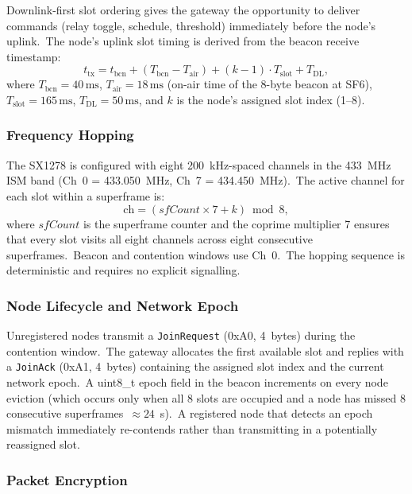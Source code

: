\documentclass[conference]{IEEEtran}
\begin{document}
Downlink-first slot ordering gives the gateway the opportunity to
deliver commands (relay toggle, schedule, threshold) immediately
before the node's uplink.\ The node's uplink slot timing is derived
from the beacon receive timestamp:
\begin{equation}
  t_{\text{tx}} = t_{\text{bcn}} + (T_{\text{bcn}} - T_{\text{air}})
                + (k-1) \cdot T_{\text{slot}} + T_{\text{DL}},
  \label{eq:slot_time}
\end{equation}
where \(T_{\text{bcn}} = 40\,\text{ms}\), \(T_{\text{air}} =
18\,\text{ms}\) (on-air time of the 8-byte beacon at SF6),
\(T_{\text{slot}} = 165\,\text{ms}\), \(T_{\text{DL}} = 50\,\text{ms}\),
and \(k\) is the node's assigned slot index (1--8).

\subsubsection{Frequency Hopping}

The SX1278 is configured with eight 200~kHz-spaced channels in the
433~MHz ISM band (Ch~0 = 433.050~MHz, Ch~7 = 434.450~MHz).\ The
active channel for each slot within a superframe is:
\begin{equation}
  \text{ch} = (\mathit{sfCount} \times 7 + k) \bmod 8,
  \label{eq:freqhop}
\end{equation}
where \(\mathit{sfCount}\) is the superframe counter and the coprime
multiplier 7 ensures that every slot visits all eight channels across
eight consecutive superframes.\ Beacon and contention windows use
Ch~0.\ The hopping sequence is deterministic and requires no explicit
signalling.

\subsubsection{Node Lifecycle and Network Epoch}

Unregistered nodes transmit a \texttt{JoinRequest} (0xA0, 4~bytes)
during the contention window.\ The gateway allocates the first
available slot and replies with a \texttt{JoinAck} (0xA1, 4~bytes)
containing the assigned slot index and the current network epoch.\ A
uint8\_t epoch field in the beacon increments on every node eviction
(which occurs only when all 8 slots are occupied and a node has missed
8 consecutive superframes~\(\approx 24\)~s).\ A registered node that
detects an epoch mismatch immediately re-contends rather than
transmitting in a potentially reassigned slot.

\subsubsection{Packet Encryption}
\end{document}
